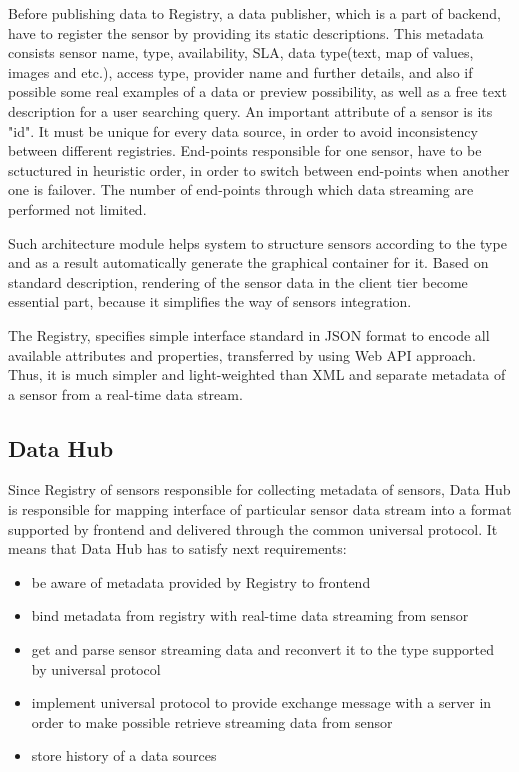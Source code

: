     Before publishing data to Registry, a data publisher, which is a part of backend, have to register the sensor by providing its static descriptions. This metadata consists sensor name, type, availability, SLA, data type(text, map of values, images and etc.), access type, provider name and further details, and also if possible some real examples of a data or preview possibility, as well as a free text description for a user searching query. An important attribute of a sensor is its "id". It must be unique for every data source, in order to avoid inconsistency between different registries. End-points responsible for one sensor, have to be sctuctured in heuristic order, in order to switch between end-points when another one is failover. The number of end-points through which data streaming are performed not limited.

    Such architecture module helps system to structure sensors according to the type and as a result automatically generate the graphical container for it. Based on standard description, rendering of the sensor data in the client tier become essential part, because it simplifies the way of sensors integration. 

    The Registry, specifies simple interface standard in JSON format to encode all available attributes and properties, transferred by using Web API approach. Thus, it is much simpler and light-weighted than XML and separate metadata of a sensor from a real-time data stream. 

  \subsection{Data Hub}
    Since Registry of sensors responsible for collecting metadata of sensors, Data Hub is responsible for mapping interface of particular sensor data stream into a format supported by frontend and delivered through the common universal protocol. It means that Data Hub has to satisfy next requirements:

    \begin{itemize}
    \item be aware of metadata provided by Registry to frontend
    \item bind metadata from registry with real-time data streaming from sensor
    \item get and parse sensor streaming data and reconvert it to the type supported by universal protocol
    \item implement universal protocol to provide exchange message with a server in order to make possible retrieve streaming data from sensor
    \item store history of a data sources
    \end{itemize}

